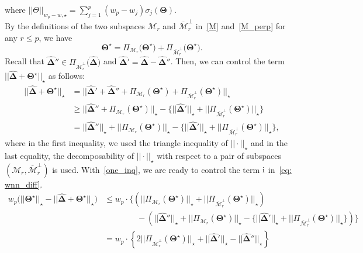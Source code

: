 \documentclass[12pt]{article}
\newcommand{\RN}[1]{%
  \textup{\uppercase\expandafter{\romannumeral#1}}%
}
\begin{document}
where $||\Theta||_{w_{p} - w, \star} = \sum^{p}_{j = 1} (w_{p} - w_{j})\sigma_{j}(\boldsymbol{\Theta})$.
\\ 
By the definitions of the two subspaces $\mathcal{M}_{r}$ and $\overline{\mathcal{M}}_{r}^{\perp}$ in~\eqref{M} and~\eqref{M_perp} for any $r\leq p$, we have
\begin{equation} \label{star}
    \boldsymbol{\Theta^{\star}} = \Pi_{\mathcal{M}_{r}}\big(\boldsymbol{\Theta^{\star}}\big) +  \Pi_{\overline{\mathcal{M}}_{r}^{\perp}}\big(\boldsymbol{\Theta^{\star}}\big).
\end{equation}
Recall that $\boldsymbol{\widehat{\Delta}}'' \in \Pi_{\overline{\mathcal{M}}_{r}^{\perp}}\big(\boldsymbol{\widehat{\Delta}}\big)$ and 
$\boldsymbol{\widehat{\Delta}}'=\boldsymbol{\widehat{\Delta}}-\boldsymbol{\widehat{\Delta}}''$.
Then, we can control the term $||\boldsymbol{\widehat{\Delta}} + \boldsymbol{\Theta^{\star}}||_{\star}$ as follows: 
\begin{align}
    ||\boldsymbol{\widehat{\Delta}} + \boldsymbol{\Theta^{\star}}||_{\star} & =  ||\boldsymbol{\widehat{\Delta}}' + \boldsymbol{\widehat{\Delta}}'' + \Pi_{\mathcal{M}_{r}}(\boldsymbol{\Theta^{\star}}) + \Pi_{\overline{\mathcal{M}}_{r}^{\perp}}(\boldsymbol{\Theta^{\star}})||_{\star}\nonumber \\
    & \geq  ||\boldsymbol{\widehat{\Delta}}'' + \Pi_{\mathcal{M}_{r}}(\boldsymbol{\Theta^{\star}})||_{\star} - \{||\boldsymbol{\widehat{\Delta}}'||_{\star} + ||\Pi_{\overline{\mathcal{M}}_{r}^{\perp}}(\boldsymbol{\Theta^{\star}})||_{\star}\} \nonumber\\
    & =  ||\boldsymbol{\widehat{\Delta}}''||_{\star} + ||\Pi_{\mathcal{M}_{r}}(\boldsymbol{\Theta^{\star}})||_{\star} - \{||\boldsymbol{\widehat{\Delta}}'||_{\star} + ||\Pi_{\overline{\mathcal{M}}_{r}^{\perp}}(\boldsymbol{\Theta^{\star}})||_{\star}\} \label{one_inq},
\end{align}
where in the first inequality, we used the triangle inequality of $||\cdot||_{\star}$ and in the last equality, the decomposability of $||\cdot||_{\star}$ with respect to a pair of subspaces $(\mathcal{M}_{r},\overline{\mathcal{M}}_{r}^{\perp})$ is used.
With~\eqref{one_inq}, we are ready to control the term $\RN{1}$ in~\eqref{eq: wnn_diff}.
\begin{align}
    w_{p}\Bigg( ||\boldsymbol{\Theta^{\star}}||_{\star} - ||\boldsymbol{\widehat{\Delta}} + \boldsymbol{\Theta^{\star}}||_{\star} \Bigg) 
    & \leq  w_{p} \cdot \Bigg\{ \left( ||\Pi_{\mathcal{M}_{r}}(\boldsymbol{\Theta^{\star}})||_{\star} + ||\Pi_{\overline{\mathcal{M}}_{r}^{\perp}}(\boldsymbol{\Theta^{\star}})||_{\star} \right) \nonumber \\ 
    &\qquad \qquad - \left(||\boldsymbol{\widehat{\Delta}}''||_{\star} + ||\Pi_{\mathcal{M}_{r}}(\boldsymbol{\Theta^{\star}})||_{\star} - \{||\boldsymbol{\widehat{\Delta}}'||_{\star} + ||\Pi_{\overline{\mathcal{M}}_{r}^{\perp}}(\boldsymbol{\Theta^{\star}})||_{\star}\} \right) \Bigg\} \nonumber \\
    & =  w_{p} \cdot \left\lbrace 2||\Pi_{\overline{\mathcal{M}}_{r}^{\perp}}(\boldsymbol{\Theta^{\star}})||_{\star} + ||\boldsymbol{\widehat{\Delta}}'||_{\star} - ||\boldsymbol{\widehat{\Delta}}''||_{\star} \right\rbrace \label{eq: wnn_diff_1}
\end{align}
\end{document}
